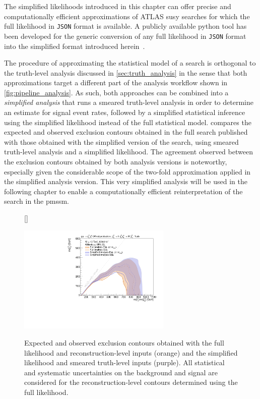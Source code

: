 The simplified likelihoods introduced in this chapter can offer precise and computationally efficient approximations of ATLAS \gls{susy} searches for which the full likelihood in \texttt{JSON} format is available. A publicly available python tool has been developed for the generic conversion of any full likelihood in \texttt{JSON} format into the simplified format introduced herein~\cite{simplify}.

The procedure of approximating the statistical model of a search is orthogonal to the truth-level analysis discussed in \cref{sec:truth_analysis} in the sense that both approximations target a different part of the analysis workflow shown in \cref{fig:pipeline_analysis}.
As such, both approaches can be combined into a \textit{simplified analysis} that runs a smeared truth-level analysis in order to determine an estimate for signal event rates, followed by a simplified statistical inference using the simplified likelihood instead of the full statistical model.
 compares the expected and observed exclusion contours obtained in the full \onelepton search published with those obtained with the simplified version of the search, using smeared truth-level analysis and a simplified likelihood.
The agreement observed between the exclusion contours obtained by both analysis versions is noteworthy, especially given the considerable scope of the two-fold approximation applied in the simplified analysis version.
This very simplified analysis will be used in the following chapter to enable a computationally efficient reinterpretation of the \onelepton search in the \gls{pmssm}.

\begin{figure}
[\FBwidth]
{\caption{Expected and observed exclusion contours obtained with the full likelihood and reconstruction-level inputs (orange) and the simplified likelihood and smeared truth-level inputs (purple). All statistical and systematic uncertainties on the background and signal are considered for the reconstruction-level contours determined using the full likelihood.}\label{fig:exclusion_1Lbb_truthInput_BkgSignal_700_200_noLabel}}
{\includegraphics[width=0.65\textwidth]{exclusion_1Lbb_truthInput_BkgSignal_700_200_noLabel}}
\end{figure}

